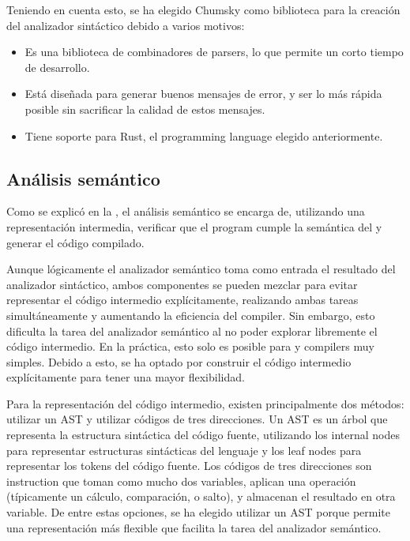 Teniendo en cuenta esto, se ha elegido Chumsky como biblioteca para la creación
del analizador sintáctico debido a varios motivos:

\begin{itemize}
    \item Es una biblioteca de combinadores de \glspl{parser}, lo que permite un
    corto tiempo de desarrollo.
    \item Está diseñada para generar buenos mensajes de error, y ser lo más
    rápida posible sin sacrificar la calidad de estos mensajes.
    \item Tiene soporte para Rust, el \gls{programming language} elegido
    anteriormente.
\end{itemize}

\subsection{Análisis semántico}\label{subsec:compiler}

Como se explicó en la , el análisis semántico se
encarga de, utilizando una representación intermedia, verificar que el
\gls{program} cumple la semántica del  y
generar el código compilado.

Aunque lógicamente el analizador semántico toma como entrada el resultado del
analizador sintáctico, ambos componentes se pueden mezclar para evitar
representar el código intermedio explícitamente, realizando ambas tareas
simultáneamente y aumentando la eficiencia del \gls{compiler}. Sin embargo, esto
dificulta la tarea del analizador semántico al no poder explorar libremente el
código intermedio. En la práctica, esto solo es posible para
 y \glspl{compiler} muy simples. Debido
a esto, se ha optado por construir el código intermedio explícitamente para
tener una mayor flexibilidad. \parencite{compiler-design}

Para la representación del código intermedio, existen principalmente dos
métodos: utilizar un \gls{AST} y utilizar códigos de tres direcciones. Un
\gls{AST} es un árbol que representa la estructura sintáctica del código fuente,
utilizando los \glspl{internal node} para representar estructuras sintácticas
del lenguaje y los \glspl{leaf node} para representar los \glspl{token} del
código fuente. Los códigos de tres direcciones son \gls{instruction} que toman
como mucho dos variables, aplican una operación (típicamente un cálculo,
comparación, o salto), y almacenan el resultado en otra variable. De entre estas
opciones, se ha elegido utilizar un \gls{AST} porque permite una representación
más flexible que facilita la tarea del analizador semántico.
\parencite{dragon-book}

